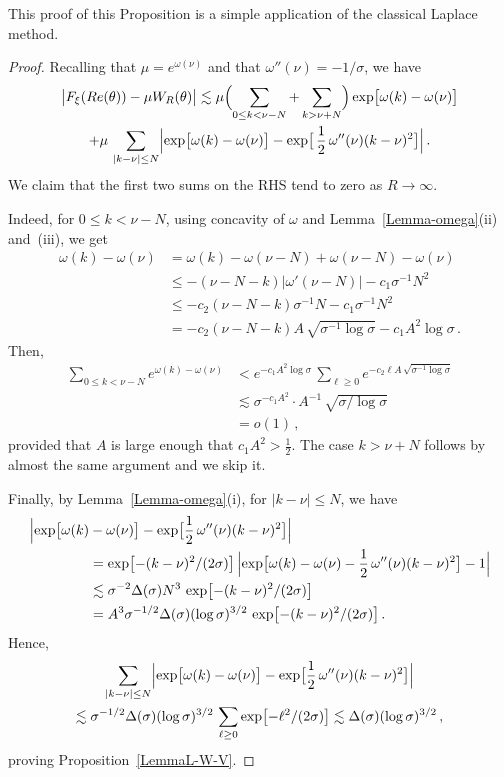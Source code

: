 \documentclass[11pt]{amsart}
\numberwithin{equation}{section}
\begin{document}
This proof of this Proposition is a simple application of the classical Laplace method.

\begin{proof}
Recalling that $\mu=e^{\omega(\nu)}$ and that $\omega''(\nu)=-1/\sigma$, we
have
\begin{multline*}
\bigl| F_\xi (Re(\theta)) - \mu W_R(\theta) \bigr|
\lesssim \mu \Bigl( \sum_{0\le k < \nu-N} + \sum_{k>\nu + N} \Bigr)
\exp\bigl[\omega (k) - \omega(\nu) \bigr] \\
 + \mu\, \sum_{|k-\nu|\le N}
 \Bigl| \exp\bigl[ \omega(k)-\omega(\nu) \bigr] - \exp\bigl[\,
 \frac12\, \omega''(\nu) (k-\nu)^2 \bigr] \Bigr|\,.
\end{multline*}
We claim that the first two sums on the RHS tend to zero as $R\to\infty$.

Indeed, for $0\le k < \nu-N$, using concavity of $\omega$ and Lemma~\ref{Lemma-omega}(ii) and~(iii),
we get
\begin{align*}
\omega (k) - \omega (\nu) &=
\omega (k) - \omega (\nu-N) + \omega (\nu-N) - \omega (\nu) \\
&\le - (\nu - N - k)|\omega'(\nu-N)| - c_1 \sigma^{-1} N^2 \\
&\le -c_2 (\nu-N-k) \sigma^{-1} N - c_1 \sigma^{-1} N^2 \\
&=  - c_2 (\nu-N-k) A\, \sqrt{\sigma^{-1}\log\sigma} -  c_1 A^2\log\sigma\,.
\end{align*}
Then,
\begin{align*}
\sum_{0\le k < \nu-N} e^{\omega(k)-\omega(\nu)} &<
e^{-c_1 A^2\log\sigma}\,
\sum_{\ell\ge 0} e^{-c_2\ell A\,\sqrt{\sigma^{-1}\log\sigma}} \\
&\lesssim \sigma^{-c_1A^2} \cdot A^{-1}\, \sqrt{\sigma/\log\sigma} \\
&= o(1)\,,
\end{align*}
provided that $A$ is large enough that $c_1 A^2 > \tfrac12$.
The case $k>\nu+N$ follows by almost the same argument and we skip it.

Finally, by Lemma~\ref{Lemma-omega}(i), for $|k-\nu|\le N$, we have
\begin{align*}
\Bigl| \exp\bigl[ \omega(k) &- \omega(\nu) \bigr] - \exp\bigl[ \frac12\, \omega''(\nu) (k-\nu)^2 \bigr]\Bigr| \\
&= \exp\bigl[ -(k-\nu)^2/(2\sigma) \bigr]\,
\Bigl| \exp\bigl[ \omega(k)-\omega(\nu) - \frac12\, \omega''(\nu) (k-\nu)^2 \bigr] - 1 \Bigr| \\
&\lesssim \sigma^{-2}\Delta(\sigma) N^3\,
\exp\bigl[-(k-\nu)^2/(2\sigma)\bigr] \\
&= A^3 \sigma^{-1/2}\Delta(\sigma) (\log\sigma)^{3/2} \,
\exp\bigl[-(k-\nu)^2/(2\sigma)\bigr]\,.
\end{align*}
Hence,
\begin{multline*}
\sum_{|k-\nu|\le N} \Bigl| \exp\bigl[ \omega(k)-\omega(\nu) \bigr]
- \exp\bigl[ \frac12\, \omega''(\nu) (k-\nu)^2 \bigr]
\Bigr| \\
\lesssim
\sigma^{-1/2}\Delta(\sigma) (\log\sigma)^{3/2}\,
\sum_{\ell\ge 0} \exp\bigl[ -\ell^2/(2\sigma) \bigr] \lesssim
\Delta(\sigma) (\log\sigma)^{3/2}\,,
\end{multline*}
proving Proposition~\ref{LemmaL-W-V}.
\end{proof}
\end{document}
